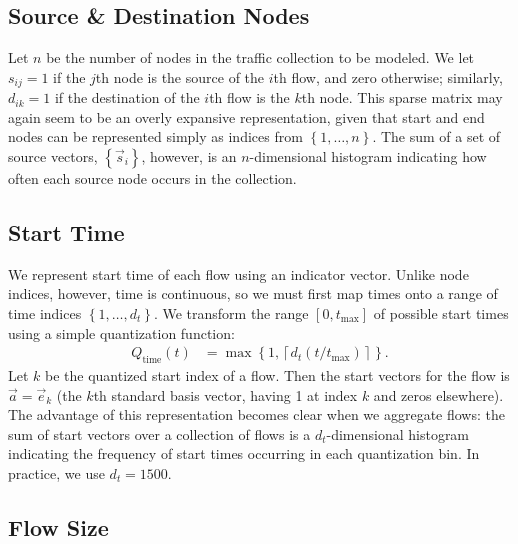 \documentclass[twocolumn,final]{svjour3}
\newcommand{\Qt}{Q_{\text{time}}}
\newcommand{\set}[1]{\left\{#1\right\}}
\newcommand{\ceil}[1]{\left\lceil#1\right\rceil}
\newcommand{\fracpx}[2]{(#1/#2)}
\begin{document}
\subsection{Source \& Destination Nodes}

Let $n$ be the number of nodes in the traffic collection to be modeled. We let $s_{ij}=1$ if the $j$th node is the source of the $i$th flow, and zero otherwise; similarly, $d_{ik}=1$ if the destination of the $i$th flow is the $k$th node. This sparse matrix may again seem to be an overly expansive representation, given that start and end nodes can be represented simply as indices from $\set{1,\dots,n}$. The sum of a set of source vectors, $\set{\vec{s}_i}$, however, is an $n$-dimensional histogram indicating how often each source node occurs in the collection.

\subsection{Start Time}

We represent start time of each flow using an indicator vector. Unlike node indices, however, time is continuous, so we must first map times onto a range of time indices $\set{1,\dots,d_t}$. We transform the range $[0,t_{\max}]$ of possible start times using a simple quantization function:
\begin{align}
\label{eqn:time-quantization}
\Qt(t) &= \max\set{1,\ceil{d_t\fracpx{t}{t_{\max}}}}.
\end{align}
Let $k$ be the quantized start index of a flow. Then the start vectors for the flow is $\vec{a}=\vec{e}_k$ (the $k$th standard basis vector, having 1 at index $k$ and zeros elsewhere). The advantage of this representation becomes clear when we aggregate flows: the sum of start vectors over a collection of flows is a $d_t$-dimensional histogram indicating the frequency of start times occurring in each quantization bin. In practice, we use $d_t=1500$.

\subsection{Flow Size}
\end{document}
